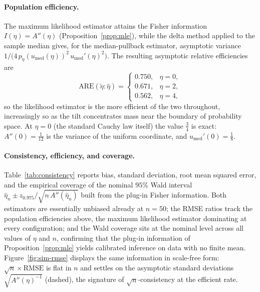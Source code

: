 \documentclass[11pt]{article}
\theoremstyle{definition}
\begin{document}
\paragraph{Population efficiency.}
The maximum likelihood estimator attains the Fisher information
$I(\eta)=A''(\eta)$ (Proposition~\ref{prop:mle}), while the delta method
applied to the sample median gives, for the median-pullback estimator,
asymptotic variance
$1/\bigl(4\,p_\eta(u_{\mathrm{med}}(\eta))^2\,u_{\mathrm{med}}'(\eta)^2\bigr)$.
The resulting asymptotic relative efficiencies are
\[
\mathrm{ARE}(\tilde\eta:\hat\eta)=
\begin{cases}
0.750, & \eta=0,\\
0.671, & \eta=2,\\
0.562, & \eta=4,
\end{cases}
\]
so the likelihood estimator is the more efficient of the two throughout,
increasingly so as the tilt concentrates mass near the boundary of
probability space. At $\eta=0$ (the standard Cauchy law itself) the value
$\tfrac34$ is exact: $A''(0)=\tfrac1{12}$ is the variance of the uniform
coordinate, and $u_{\mathrm{med}}'(0)=\tfrac18$.

\paragraph{Consistency, efficiency, and coverage.}
Table~\ref{tab:consistency} reports bias, standard deviation, root mean
squared error, and the empirical coverage of the nominal $95\%$ Wald
interval $\hat\eta_n\pm z_{0.975}/\sqrt{n\,A''(\hat\eta_n)}$ built from the
plug-in Fisher information. Both estimators are essentially unbiased
already at $n=50$; the RMSE ratios track the population efficiencies above,
the maximum likelihood estimator dominating at every configuration; and the
Wald coverage sits at the nominal level across all values of $\eta$ and
$n$, confirming that the plug-in information of
Proposition~\ref{prop:mle} yields calibrated inference on data with no
finite mean. Figure~\ref{fig:sim-rmse} displays the same information in
scale-free form: $\sqrt n\times\text{RMSE}$ is flat in $n$ and settles on
the asymptotic standard deviations $\sqrt{A''(\eta)^{-1}}$ (dashed), the
signature of $\sqrt n$-consistency at the efficient rate.
\end{document}
